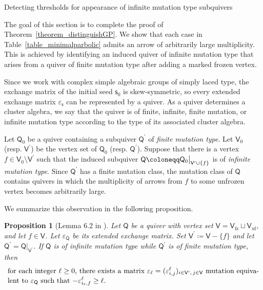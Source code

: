 \documentclass[11pt]{amsart}
\makeatletter
\def\section{\@startsection{section}{1}%
  \z@{-1.2\linespacing\@plus-.5\linespacing}{.8\linespacing}%
  {\normalfont\bfseries\large}}
\numberwithin{equation}{section}
\theoremstyle{plain}
\newtheorem{proposition}[theorem]{Proposition}
\theoremstyle{definition}
\numberwithin{equation}{section}
\newcommand{\seed}{\mathsf{s}}
\makeatother
\begin{document}
\section{Detecting thresholds for appearance of infinite mutation type subquivers}\label{sec_distinguishing}

The goal of this section is to complete the proof of Theorem~\ref{theorem_distinguishGP}. We show that each case in Table~\ref{table_minimalparbolic} admits an arrow of arbitrarily large multiplicity. This is achieved by identifying an induced quiver of infinite mutation type that arises from a quiver of finite mutation type after adding a marked frozen vertex. 

Since we work with complex simple algebraic groups of simply laced type, the exchange matrix of the initial seed $\seed_0$ is skew-symmetric, so every extended exchange matrix $\varepsilon_{\seed}$ can be represented by a quiver. As a quiver determines a cluster algebra, we say that the quiver is of finite, infinite, finite mutation, or infinite mutation type according to the type of its associated cluster algebra.

Let $\mathsf{Q}_0$ be a quiver containing a subquiver $\mathsf{Q}^\prime$ of \emph{finite mutation type}. Let $\mathsf{V}_0$ (resp. $\mathsf{V}^\prime$) be the vertex set of $\mathsf{Q}_0$ (resp. $\mathsf{Q}^\prime$). Suppose that there is a vertex $f \in \mathsf{V}_0 \setminus \mathsf{V}^\prime$ such that the induced subquiver $\mathsf{Q} \coloneqq \mathsf{Q}_0 \big{|}_{\mathsf{V}^\prime \cup \{f\}}$ is of \emph{infinite mutation type}. Since $\mathsf{Q}^\prime$ has a finite mutation class, the mutation class of $\mathsf{Q}$ contains quivers  in which the multiplicity of arrows from $f$ to some unfrozen vertex becomes arbitrarily large. 

We summarize this observation in the following proposition.

\begin{proposition}[Lemma 6.2 in \cite{CKKP25}]\label{proposition_multiplicityquiver}
Let $\mathsf{Q}$ be a quiver with vertex set $\mathsf{V} = \mathsf{V}_\mathrm{fz} \sqcup \mathsf{V}_\mathrm{uf}$, and let $f \in \mathsf{V}$. Let $\varepsilon_\mathsf{Q}$ be its extended exchange matrix.
Set $\mathsf{V}^\prime \coloneqq \mathsf{V} - \{f\}$ and let $\mathsf{Q}^\prime = \mathsf{Q} |_{\mathsf{V}^\prime}$.
If $\mathsf{Q}$ is of infinite mutation type while $\mathsf{Q}^\prime$ is of finite mutation type, then 
\begin{equation} \label{eq:manyarrows2}
    \text{\parbox{35em}{
for each integer $\ell \geq 0$, there exists a matrix $\varepsilon_{\ell} =(\varepsilon^{\ell}_{i,j})_{ i \in \mathsf{V}^\prime,\, j \in \mathsf{V}}$ mutation equivalent to $\varepsilon_\mathsf{Q}$ such that
$- \varepsilon^{\ell}_{i_\ell,f} \geq \ell.$  
}}
\end{equation}
\end{proposition}
\end{document}
